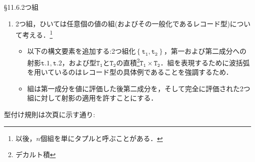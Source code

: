 \documentclass[9pt]{beamer}
\begin{document}
\begin{frame}{\S11.6.2つ組}
\begin{enumerate}
\item 2つ組，ひいては任意個の値の組(およびその一般化であるレコード型)について考える．\footnote{以後，$n$個組を単にタプルと呼ぶことがある．}\begin{itemize}
\item 以下の構文要素を追加する:2つ組化$\left\{\mathtt{t_{1},t_{2}}\right\}$，第一および第二成分への射影$\mathtt{t.1, t.2}$，および型$\mathtt{T_{1}}$と$\mathtt{T_{2}}$の直積\footnote{デカルト積}$\mathtt{T_{1}\times T_{2}}$．組を表現するために波括弧を用いているのはレコード型の具体例であることを強調するため．
\item 組は第一成分を値に評価した後第二成分を，そして完全に評価された2つ組に対して射影の適用を許すことにする．
\end{itemize}
\end{enumerate}
型付け規則は次頁に示す通り:
\end{frame}
\end{document}
